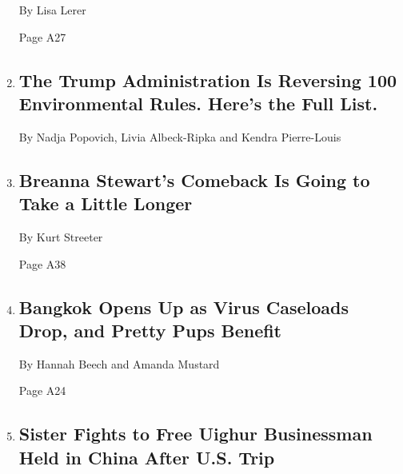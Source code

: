 \begin{enumerate}
  By Lisa Lerer

  Page A27
\item
  \href{/interactive/2020/climate/trump-environment-rollbacks.html}{}

  \hypertarget{the-trump-administration-is-reversing-100-environmental-rules-heres-the-full-list}{%
  \subsection{The Trump Administration Is Reversing 100 Environmental
  Rules. Here's the Full
  List.}\label{the-trump-administration-is-reversing-100-environmental-rules-heres-the-full-list}}

  By Nadja Popovich, Livia Albeck-Ripka and Kendra Pierre-Louis
\item
  \href{/2020/05/09/sports/basketball/breanna-stewart-wnba-return.html}{}

  \hypertarget{breanna-stewarts-comeback-is-going-to-take-a-little-longer}{%
  \subsection{Breanna Stewart's Comeback Is Going to Take a Little
  Longer}\label{breanna-stewarts-comeback-is-going-to-take-a-little-longer}}

  By Kurt Streeter

  Page A38
\item
  \href{/2020/05/10/world/asia/bangkok-coronavirus-pet-salons-dogs.html}{}

  \hypertarget{bangkok-opens-up-as-virus-caseloads-drop-and-pretty-pups-benefit}{%
  \subsection{Bangkok Opens Up as Virus Caseloads Drop, and Pretty Pups
  Benefit}\label{bangkok-opens-up-as-virus-caseloads-drop-and-pretty-pups-benefit}}

  By Hannah Beech and Amanda Mustard

  Page A24
\item
  \href{/2020/05/09/us/politics/china-uighurs-arrest.html}{}

  \hypertarget{sister-fights-to-free-uighur-businessman-held-in-china-after-us-trip}{%
  \subsection{Sister Fights to Free Uighur Businessman Held in China
  After U.S.
  Trip}\label{sister-fights-to-free-uighur-businessman-held-in-china-after-us-trip}}


\end{enumerate}
